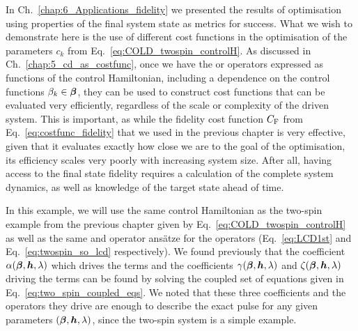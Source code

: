 In Ch.~\ref{chap:6_Applications_fidelity} we presented the results of optimisation using properties of the final system state as metrics for success. What we wish to demonstrate here is the use of different cost functions in the optimisation of the parameters $c_k$ from Eq.~\eqref{eq:COLD_twospin_controlH}. As discussed in Ch.~\ref{chap:5_cd_as_costfunc}, once we have the  or  operators expressed as functions of the control Hamiltonian, including a dependence on the control functions $\beta_k \in \boldsymbol{\beta}$, they can be used to construct cost functions that can be evaluated very efficiently, regardless of the scale or complexity of the driven system. This is important, as while the fidelity cost function $C_{\rm F}$ from Eq.~\eqref{eq:costfunc_fidelity} that we used in the previous chapter is very effective, given that it evaluates exactly how close we are to the goal of the optimisation, its efficiency scales very poorly with increasing system size. After all, having access to the final state fidelity requires a calculation of the complete system dynamics, as well as knowledge of the target state ahead of time. 

In this example, we will use the same control Hamiltonian as the two-spin example from the previous chapter given by Eq.~\eqref{eq:COLD_twospin_controlH} as well as the same  and  operator ans\"{a}tze for the  operators (Eq.~\eqref{eq:LCD1st} and Eq.~\eqref{eq:twospin_so_lcd} respectively). We found previously that the coefficient $\alpha(\boldsymbol{\beta}, \boldsymbol{h}, \lambda)$ which drives the   terms and the coefficients $\gamma(\boldsymbol{\beta}, \boldsymbol{h}, \lambda)$ and $\zeta(\boldsymbol{\beta}, \boldsymbol{h}, \lambda)$ driving the   terms can be found by solving the coupled set of equations given in Eq.~\eqref{eq:two_spin_coupled_eqs}. We noted that these three coefficients and the operators they drive are enough to describe the exact  pulse for any given parameters $(\boldsymbol{\beta}, \boldsymbol{h}, \lambda)$, since the two-spin system is a simple example.

